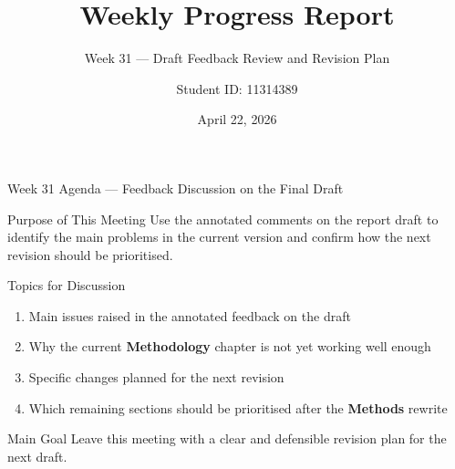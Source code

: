 \documentclass[aspectratio=169, 11pt]{beamer}
\title{Weekly Progress Report}
\subtitle{Week 31 --- Draft Feedback Review and Revision Plan}
\author{Student ID: 11314389}
\institute{BCI Control System Project}
\date{April 22, 2026}
\begin{document}
\begin{frame}
    \titlepage
\end{frame}

\begin{frame}[shrink=7]{Week 31 Agenda --- Feedback Discussion on the Final Draft}

    \begin{block}{Purpose of This Meeting}
        Use the annotated comments on the report draft to identify the main problems in the current version and confirm how the next revision should be prioritised.
    \end{block}

    \vspace{2mm}
    \begin{exampleblock}{Topics for Discussion}
        \begin{enumerate}
            \item Main issues raised in the annotated feedback on the draft
            \item Why the current \textbf{Methodology} chapter is not yet working well enough
            \item Specific changes planned for the next revision
            \item Which remaining sections should be prioritised after the \textbf{Methods} rewrite
        \end{enumerate}
    \end{exampleblock}

    \vspace{2mm}
    \begin{alertblock}{Main Goal}
        Leave this meeting with a clear and defensible revision plan for the next draft.
    \end{alertblock}
\end{frame}
\end{document}
